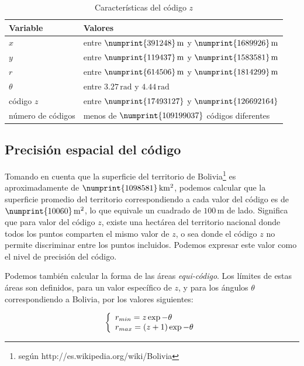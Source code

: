 \documentclass[letterpaper]{article}
\begin{document}
\begin{table}
	\centering
	\begin{tabular}{|l|l|}
		\hline
		Variable & Valores \\
		\hline
		\(x\) & entre \(\numprint{391248}\,\mathrm{m}\) y \(\numprint{1689926}\,\mathrm{m}\) \\
		\(y\) & entre \(\numprint{119437}\,\mathrm{m}\) y \(\numprint{1583581}\,\mathrm{m}\) \\
		\hline
		\(r\) & entre \(\numprint{614506}\,\mathrm{m}\) y \(\numprint{1814299}\,\mathrm{m}\) \\
		\(\theta\) & entre \(3.27\,\mathrm{rad}\) y \(4.44\,\mathrm{rad}\) \\
		\hline
		código \(z\) & entre \(\numprint{17493127}\) y \(\numprint{126692164}\) \\
		número de códigos & menos de \(\numprint{109199037}\) códigos diferentes \\
		\hline
	\end{tabular}
	\caption{Características del código \(z\)}
	\label{tab:variables}
\end{table}

\subsection{Precisión espacial del código}

Tomando en cuenta que la superficie del territorio de Bolivia\footnote{según http://es.wikipedia.org/wiki/Bolivia} es aproximadamente de \(\numprint{1098581}\,\mathrm{km^{2}}\), podemos calcular que la superficie promedio del territorio correspondiendo a cada valor del código es de \(\numprint{10060}\,\mathrm{m^{2}}\), lo que equivale un cuadrado de \(100\,\mathrm{m}\) de lado. Significa que para valor del código \(z\), existe una hectárea del territorio nacional donde todos los puntos comparten el mismo valor de \(z\), o sea donde el código \(z\) no permite discriminar entre los puntos incluidos. Podemos expresar este valor como el nivel de precisión del código.

Podemos también calcular la forma de las áreas \emph{equi-código}. Los límites de estas áreas son definidos, para un valor específico de \(z\), y para los ángulos \(\theta\) correspondiendo a Bolivia, por los valores siguientes:

\[
\left\{
\begin{array}{l l}
r_{min} = z \exp{-\theta} \\
r_{max} = (z+1) \exp{-\theta}
\end{array} \right.
\]
\end{document}
